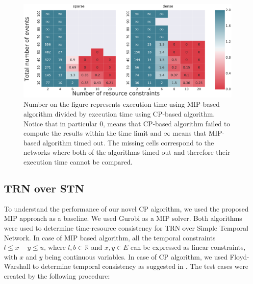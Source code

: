 \begin{figure}
\begin{center}
\includegraphics[width=\textwidth]{when_better}
\caption{Number on the figure represents execution time using MIP-based algorithm divided by execution time using CP-based algorithm. Notice that in particular $0$, means that CP-based algorithm failed to compute the results within the time limit and $\infty$ means that MIP-based algorithm timed out. The missing cells correspond to the networks where both of the algorithms timed out and therefore their execution time cannot be compared.   }
\label{fig:when_better}
\end{center}
\end{figure}

\subsection{TRN over STN}
To understand the performance of our novel CP algorithm, we used the proposed MIP approach as a baseline. We used Gurobi as a MIP solver. Both algorithms were used to determine time-resource consistency for TRN over Simple Temporal Network. In case of MIP based algorithm, all the temporal constraints $l \leq x - y \leq u$, where $l,b \in \mathbb{R}$ and $x,y \in E$ can be expressed as linear constraints, with $x$ and $y$ being continuous variables. In case of CP algorithm, we used Floyd-Warshall to determine temporal consistency as suggested in \cite{dechter1991temporal}. The test cases were created by the following procedure:


